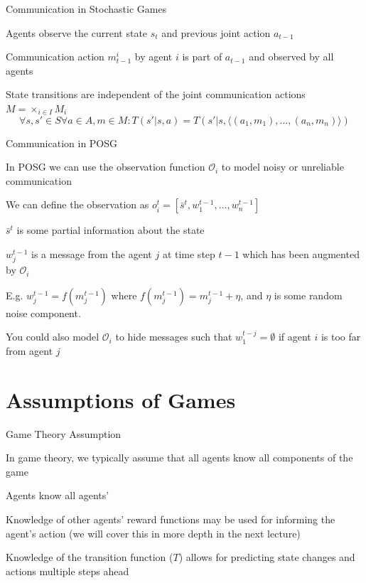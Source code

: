 \begin{frame}{Communication in Stochastic Games}
    \blist
        \item Agents observe the current state \( s_t \) and previous joint action \( a_{t-1} \) 
        \item Communication action \( m_{t-1}^i \) by agent \( i \) is part of \( a_{t-1} \) and observed by all agents
        \item State transitions are independent of the joint communication actions \( M = \times_{i \in I} M_i \)
    \elist
    \begin{equation*}
        \forall s, s' \in S \forall a \in A, m \in M : T(s'|s, a) = T(s'|s, \langle(a_{1}, m_{1}), \ldots, (a_{n}, m_{n})\rangle)
    \end{equation*}
\end{frame}

\begin{frame}{Communication in POSG}

    \blist
        \item In POSG we can use the observation function \(\mathcal{O}_i\) to model noisy or unreliable communication
        \item We can define the observation as \(o_{i}^{t} = [\bar{s}^t, w^{t-1}_{1}, ..., w^{t-1}_{n}]\)
        \blist
            \item \(\bar{s}^t\) is some partial information about the state 
            \item \(w_{j}^{t-1}\) is a message from the agent \(j\) at time step \(t-1\) which has been augmented by \(\mathcal{O}_i\)
            \item E.g. \(w_{j}^{t-1} = f(m_{j}^{t-1})\) where \(f(m_{j}^{t-1}) = m_{j}^{t-1} + \eta\), and \(\eta\) is some random noise component.
        \elist
        \item You could also model $\mathcal{O}_i$ to hide messages such that $w^{t-j}_{1} = \emptyset$  if agent $i$ is too far from agent $j$
    \elist
    
\end{frame}

\section{Assumptions of Games}

\begin{frame}{Game Theory Assumption}

    \blist
        \item  In game theory, we typically assume that all agents know all components of the game 
        \item Agents know all agents' 
        \item Knowledge of other agents' reward functions may be used for informing the agent's  action (we will cover this in more depth in the next lecture)
        \item Knowledge of the transition function (\( T \)) allows for predicting state changes and  actions multiple steps ahead
    \elist
    
\end{frame}

